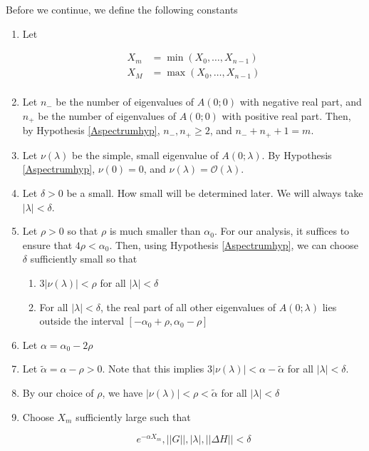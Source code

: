 \documentclass[12pt]{article}
\begin{document}
Before we continue, we define the following constants

\begin{enumerate}

	\item Let

	\begin{align*}
	X_m &= \min(X_0, \dots, X_{n-1}) \\
	X_M &= \max(X_0, \dots, X_{n-1}) \\
	\end{align*}

	\item Let $n_-$ be the number of eigenvalues of $A(0; 0)$ with negative real part, and $n_+$ be the number of eigenvalues of $A(0; 0)$ with positive real part. Then, by Hypothesis \ref{Aspectrumhyp}, $n_-, n_+ \geq 2$, and $n_- + n_+ + 1 = m$.

	\item Let $\nu(\lambda)$ be the simple, small eigenvalue of $A(0; \lambda)$. By Hypothesis \ref{Aspectrumhyp}, $\nu(0) = 0$, and $\nu(\lambda) = \mathcal{O}(\lambda)$. 

	\item Let $\delta > 0$ be a small. How small will be determined later. We will always take $|\lambda| < \delta$.

	\item Let $\rho > 0$ so that $\rho$ is much smaller than $\alpha_0$. For our analysis, it suffices to ensure that $4 \rho < \alpha_0$. Then, using Hypothesis \ref{Aspectrumhyp}, we can choose $\delta$ sufficiently small so that 

	\begin{enumerate}
		\item $3 |\nu(\lambda)| < \rho$ for all $|\lambda| < \delta$ 
		\item For all $|\lambda| < \delta$, the real part of all other eigenvalues of $A(0; \lambda)$ lies outside the interval $[-\alpha_0 + \rho, \alpha_0 - \rho]$ 
	\end{enumerate}

	\item Let $\alpha = \alpha_0 - 2 \rho$

	\item Let $\tilde{\alpha} = \alpha - \rho > 0$. Note that this implies $3|\nu(\lambda)| < \alpha - \tilde{\alpha}$ for all $|\lambda| < \delta$.

	\item By our choice of $\rho$, we have $|\nu(\lambda)| < \rho < \tilde{\alpha}$ for all $|\lambda| < \delta$

	\item Choose $X_m$ sufficiently large such that

	\begin{equation}
	e^{-\alpha X_m}, ||G||, |\lambda|, ||\Delta H|| < \delta
	\end{equation}

\end{enumerate}
\end{document}
